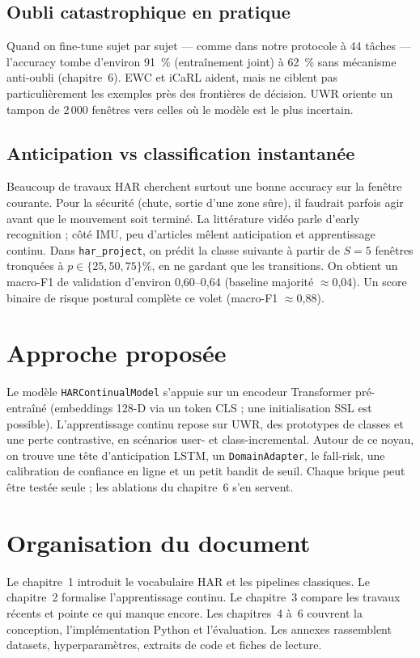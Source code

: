 \subsection{Oubli catastrophique en pratique}

Quand on fine-tune sujet par sujet --- comme dans notre protocole à 44 tâches
--- l'accuracy tombe d'environ 91~\% (entraînement joint) à 62~\% sans
mécanisme anti-oubli (chapitre~6). EWC et iCaRL aident, mais ne ciblent pas
particulièrement les exemples près des frontières de décision. UWR oriente un
tampon de 2\,000 fenêtres vers celles où le modèle est le plus incertain.

\subsection{Anticipation vs classification instantanée}

Beaucoup de travaux HAR cherchent surtout une bonne accuracy sur la fenêtre
courante. Pour la sécurité (chute, sortie d'une zone sûre), il faudrait
parfois agir avant que le mouvement soit terminé. La littérature vidéo
\parencite{ryoo2011,gammulle2019} parle d'early recognition ; côté IMU, peu
d'articles mêlent anticipation et apprentissage continu. Dans
\texttt{har\_project}, on prédit la classe suivante à partir de $S=5$
fenêtres tronquées à $p\in\{25,50,75\}\%$, en ne gardant que les transitions.
On obtient un macro-F1 de validation d'environ 0,60--0,64 (baseline majorité
$\approx$0,04). Un score binaire de risque postural complète ce volet
(macro-F1 $\approx$0,88).

\section{Approche proposée}

Le modèle \texttt{HARContinualModel} s'appuie sur un encodeur Transformer
pré-entraîné (embeddings 128-D via un token CLS ; une initialisation SSL est
possible). L'apprentissage continu repose sur UWR, des prototypes de classes
et une perte contrastive, en scénarios user- et class-incremental. Autour de
ce noyau, on trouve une tête d'anticipation LSTM, un \texttt{DomainAdapter},
le fall-risk, une calibration de confiance en ligne et un petit bandit de
seuil. Chaque brique peut être testée seule ; les ablations du chapitre~6
s'en servent.

\section{Organisation du document}

Le chapitre~1 introduit le vocabulaire HAR et les pipelines classiques. Le
chapitre~2 formalise l'apprentissage continu. Le chapitre~3 compare les
travaux récents et pointe ce qui manque encore. Les chapitres~4 à~6
couvrent la conception, l'implémentation Python et l'évaluation. Les annexes
rassemblent datasets, hyperparamètres, extraits de code et fiches de lecture.
